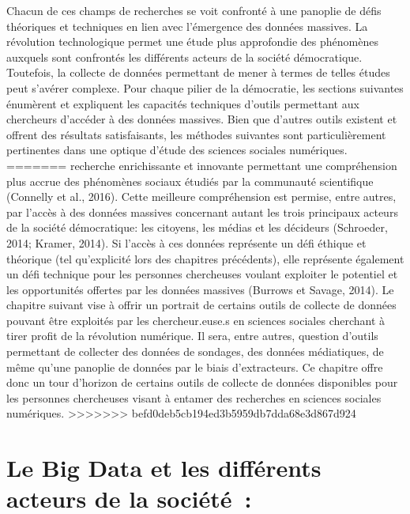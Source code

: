 \documentclass[
  letterpaper,
]{scrbook}
\begin{document}
Chacun de ces champs de recherches se voit confronté à une panoplie de
défis théoriques et techniques en lien avec l'émergence des données
massives. La révolution technologique permet une étude plus approfondie
des phénomènes auxquels sont confrontés les différents acteurs de la
société démocratique. Toutefois, la collecte de données permettant de
mener à termes de telles études peut s'avérer complexe. Pour chaque
pilier de la démocratie, les sections suivantes énumèrent et expliquent
les capacités techniques d'outils permettant aux chercheurs d'accéder à
des données massives. Bien que d'autres outils existent et offrent des
résultats satisfaisants, les méthodes suivantes sont particulièrement
pertinentes dans une optique d'étude des sciences sociales numériques.
=======
recherche enrichissante et innovante permettant une compréhension plus
accrue des phénomènes sociaux étudiés par la communauté scientifique
(Connelly et al., 2016). Cette meilleure compréhension est permise,
entre autres, par l'accès à des données massives concernant autant les
trois principaux acteurs de la société démocratique: les citoyens, les
médias et les décideurs (Schroeder, 2014; Kramer, 2014). Si l'accès à
ces données représente un défi éthique et théorique (tel qu'explicité
lors des chapitres précédents), elle représente également un défi
technique pour les personnes chercheuses voulant exploiter le potentiel
et les opportunités offertes par les données massives (Burrows et
Savage, 2014). Le chapitre suivant vise à offrir un portrait de certains
outils de collecte de données pouvant être exploités par les
chercheur.euse.s en sciences sociales cherchant à tirer profit de la
révolution numérique. Il sera, entre autres, question d'outils
permettant de collecter des données de sondages, des données
médiatiques, de même qu'une panoplie de données par le biais
d'extracteurs. Ce chapitre offre donc un tour d'horizon de certains
outils de collecte de données disponibles pour les personnes chercheuses
visant à entamer des recherches en sciences sociales numériques.
>>>>>>> befd0deb5cb194ed3b5959db7dda68e3d867d924

\hypertarget{le-big-data-et-les-diffuxe9rents-acteurs-de-la-sociuxe9tuxe9}{%
\section{\texorpdfstring{\textbf{Le Big Data et les différents acteurs
de la
société~:}}{Le Big Data et les différents acteurs de la société~:}}\label{le-big-data-et-les-diffuxe9rents-acteurs-de-la-sociuxe9tuxe9}}
\end{document}
